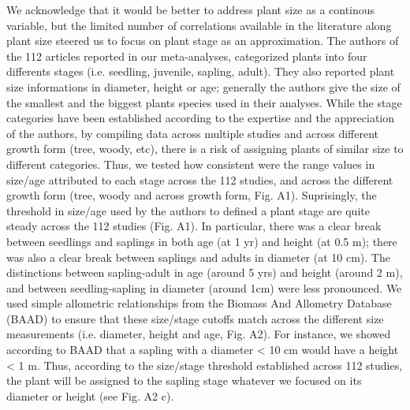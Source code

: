 \documentclass[a4paper]{article}\usepackage[]{graphicx}\usepackage[]{color}
\begin{document}
We acknowledge that it would be better to address plant size as a continous variable, but the limited number of correlations available in the literature along plant size steered us to focus on plant stage as an approximation. 
The authors of the 112 articles reported in our meta-analyses, categorized plants into four differents stages (i.e. seedling, juvenile, sapling, adult). They also reported plant size informations in diameter, height or age; generally the authors give the size of the smallest and the biggest plants species used in their analyses. While the stage categories have been established according to the expertise and the appreciation of the authors, by compiling data across multiple studies and across different growth form (tree, woody, etc), there is a risk of assigning plants of similar size to different categories. Thus, we tested how consistent were the range values in size/age attributed to each stage across the 112 studies, and across the different growth form (tree, woody and across growth form, Fig. A1). Suprisingly, the threshold in size/age used by the authors to defined a plant stage are quite steady across the 112 studies (Fig. A1). In particular, there was a clear break between seedlings and saplings in both age (at 1 yr) and height (at 0.5 m); there was also a clear break between saplings and adults in diameter (at 10 cm). The distinctions between sapling-adult in age (around 5 yrs) and height (around 2 m), and between seedling-sapling in diameter (around 1cm) were less pronounced. We used simple allometric relationships from the Biomass And Allometry Database (BAAD) \citep{Falster:2015} to ensure that these size/stage cutoffs match across the different size measurements (i.e. diameter, height and age, Fig. A2). For instance, we showed according to BAAD that a sapling with a diameter < 10 cm would have a height < 1 m. Thus, according to the size/stage threshold established across 112 studies, the plant will be assigned to the sapling stage whatever we focused on its diameter or height (see Fig. A2 c).
\end{document}
